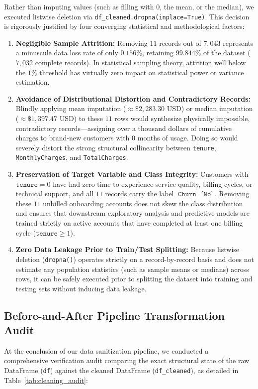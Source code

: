 Rather than imputing values (such as filling with $0$, the mean, or the median), we executed listwise deletion via \texttt{df\_cleaned.dropna(inplace=True)}. This decision is rigorously justified by four converging statistical and methodological factors:
\begin{enumerate}
    \item \textbf{Negligible Sample Attrition:} Removing $11$ records out of $7,043$ represents a minuscule data loss rate of only $0.156\%$, retaining $99.844\%$ of the dataset ($7,032$ complete records). In statistical sampling theory, attrition well below the $1\%$ threshold has virtually zero impact on statistical power or variance estimation.
    \item \textbf{Avoidance of Distributional Distortion and Contradictory Records:} Blindly applying mean imputation ($\approx \$2,283.30$ USD) or median imputation ($\approx \$1,397.47$ USD) to these $11$ rows would synthesize physically impossible, contradictory records---assigning over a thousand dollars of cumulative charges to brand-new customers with $0$ months of usage. Doing so would severely distort the strong structural collinearity between \texttt{tenure}, \texttt{MonthlyCharges}, and \texttt{TotalCharges}.
    \item \textbf{Preservation of Target Variable and Class Integrity:} Customers with $\texttt{tenure} = 0$ have had zero time to experience service quality, billing cycles, or technical support, and all $11$ records carry the label $\texttt{Churn} = \texttt{'No'}$. Removing these $11$ unbilled onboarding accounts does not skew the class distribution and ensures that downstream exploratory analysis and predictive models are trained strictly on active accounts that have completed at least one billing cycle ($\texttt{tenure} \ge 1$).
    \item \textbf{Zero Data Leakage Prior to Train/Test Splitting:} Because listwise deletion (\texttt{dropna()}) operates strictly on a record-by-record basis and does not estimate any population statistics (such as sample means or medians) across rows, it can be safely executed prior to splitting the dataset into training and testing sets without inducing data leakage.
\end{enumerate}

\subsection{Before-and-After Pipeline Transformation Audit}
At the conclusion of our data sanitization pipeline, we conducted a comprehensive verification audit comparing the exact structural state of the raw DataFrame (\texttt{df}) against the cleaned DataFrame (\texttt{df\_cleaned}), as detailed in Table~\ref{tab:cleaning_audit}:

